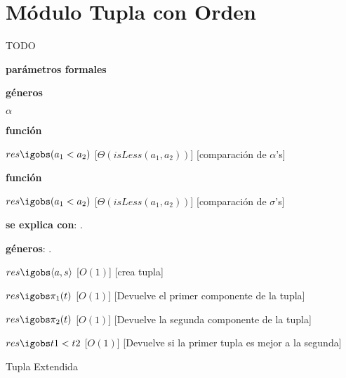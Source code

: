 \section{Módulo Tupla con Orden}

TODO

\begin{Interfaz}

	\textbf{parámetros formales}\parindent\\
	\parbox{1.7cm}{\textbf{géneros}}$\alpha$\\
	\parbox[t]{1.7cm}{\textbf{función}}\parbox[t]{.5\textwidth-\parindent-1.7cm}{
		{$res \igobs (a_1 < a_2)$}
		[$\Theta(isLess(a_1, a_2))$]
		[comparación de $\alpha$'s]
	}
	\parbox[t]{1.7cm}{\textbf{función}}\parbox[t]{.5\textwidth-\parindent-1.7cm}{
		{$res \igobs (a_1 < a_2)$}
		[$\Theta(isLess(a_1, a_2))$]
		[comparación de $\sigma$'s]
	}

	\textbf{se explica con}: .

	\textbf{géneros}: .



	{$res \igobs \langle a, s \rangle$}
	[$O(1)$]
	[crea tupla]	

	{$res \igobs \pi_1 (t)$}
	[$O(1)$]
	[Devuelve el primer componente de la tupla]

	{$res \igobs \pi_2 (t)$}
	[$O(1)$]
	[Devuelve la segunda componente de la tupla]

	{$res \igobs t1 < t2$}
	[$O(1)$]
	[Devuelve si la primer tupla es mejor a la segunda]


	\begin{tad}{Tupla Extendida}
	\parskip=0pt


	
	\tadAxiomas


	\end{tad}

\end{Interfaz}


